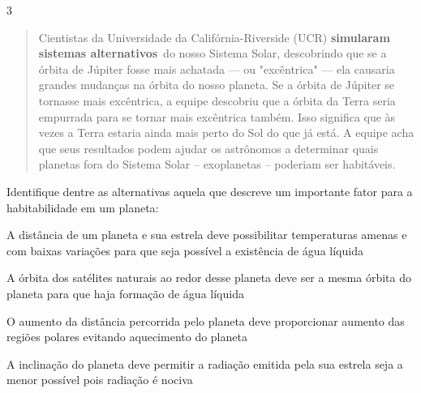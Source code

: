 
\num{3}

\begin{quote}
Cientistas da Universidade da Califórnia-Riverside
(UCR) \textbf{simularam sistemas alternativos}~do nosso Sistema Solar,
descobrindo que se a órbita de Júpiter fosse mais achatada --- ou
"excêntrica" --- ela causaria grandes mudanças na órbita
do nosso
planeta. Se a órbita de Júpiter se tornasse mais excêntrica, a equipe
descobriu que a órbita da Terra seria empurrada para se tornar mais
excêntrica também. Isso significa que às vezes a Terra estaria ainda
mais perto do Sol do que já está. A equipe acha que seus resultados
podem ajudar os astrônomos a determinar quais planetas fora do Sistema
Solar -- exoplanetas -- poderiam ser habitáveis.

\end{quote}

Identifique dentre as alternativas aquela que descreve um importante
fator para a habitabilidade em um planeta:

\begin{escolha}
\item
  A distância de um planeta e sua estrela deve possibilitar temperaturas
  amenas e com baixas variações para que seja possível a existência de
  água líquida
\item
  A órbita dos satélites naturais ao redor desse planeta deve ser a
  mesma órbita do planeta para que haja formação de água líquida
\item
  O aumento da distância percorrida pelo planeta deve proporcionar
  aumento das regiões polares evitando aquecimento do planeta
\item
  A inclinação do planeta deve permitir a radiação emitida pela sua
  estrela seja a menor possível pois radiação é nociva
\end{escolha}


